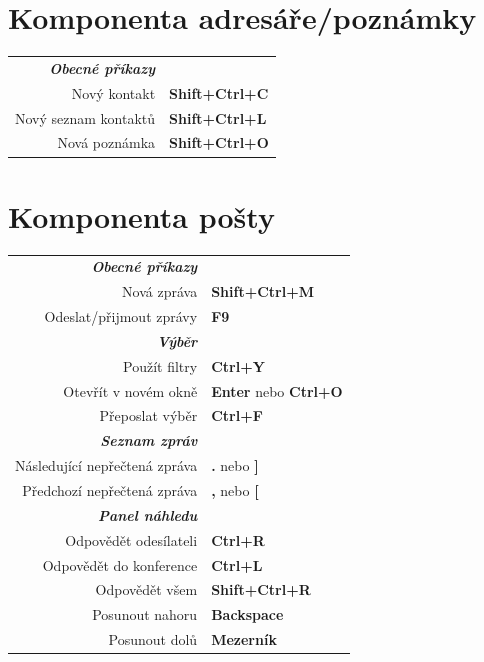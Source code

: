 \documentclass[12pt]{article}
\begin{document}
\begin{landscape}
\begin{center}
\begin{multicols}{2}
	\section*{Komponenta adresáře/poznámky}
	\begin{tabular*}{4in}{rp{1.5in}}
		\textit{\textbf{Obecné příkazy}}	&					\\
		Nový kontakt				& \textbf{Shift+Ctrl+C}			\\
		Nový seznam kontaktů			& \textbf{Shift+Ctrl+L}			\\
		Nová poznámka				& \textbf{Shift+Ctrl+O}			\\
	\end{tabular*}
	\section*{Komponenta pošty}
	\begin{tabular*}{4in}{rp{1.5in}}
		\textit{\textbf{Obecné příkazy}}	&					\\
		Nová zpráva				& \textbf{Shift+Ctrl+M}			\\
		\vspace{1.5mm}
		Odeslat/přijmout zprávy			& \textbf{F9}				\\
		\textit{\textbf{Výběr}}			&					\\
		Použít filtry				& \textbf{Ctrl+Y}			\\
		Otevřít v novém okně 			& \textbf{Enter} nebo \textbf{Ctrl+O}	\\
		\vspace{1.5mm}
		Přeposlat výběr				& \textbf{Ctrl+F}			\\
		\textit{\textbf{Seznam zpráv}}		&					\\
		Následující nepřečtená zpráva		& \textbf{.} nebo \textbf{]}		\\
		\vspace{1.5mm}
		Předchozí nepřečtená zpráva		& \textbf{,} nebo \textbf{[}		\\
		\textit{\textbf{Panel náhledu}}		&					\\
		Odpovědět odesílateli			& \textbf{Ctrl+R}			\\
		Odpovědět do konference			& \textbf{Ctrl+L}			\\
		Odpovědět všem		 		& \textbf{Shift+Ctrl+R}			\\
		Posunout nahoru				& \textbf{Backspace}			\\
		Posunout dolů				& \textbf{Mezerník}			\\
	\end{tabular*}

\end{multicols}
\end{center}
\end{landscape}
\end{document}
